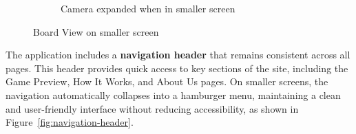 \begin{figure}[h!]
\begin{subfigure}[h!]{0.4\linewidth}
        \caption{Camera expanded when in smaller screen}
        \label{fig:small-board-view-camera-expanded}
    \end{subfigure}
    \caption{Board View on smaller screen}
    \label{fig:small-view-board-view-group}
\end{figure}

The application includes a \textbf{navigation header} that remains consistent across all pages. This header provides quick access to key sections of the site, including the Game Preview, How It Works, and About Us pages. On smaller screens, the navigation automatically collapses into a hamburger menu, maintaining a clean and user-friendly interface without reducing accessibility, as shown in Figure~\ref{fig:navigation-header}. \\

